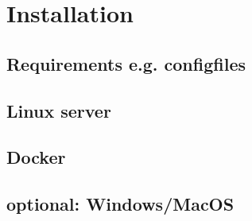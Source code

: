 
\section{Installation}

\subsection{Requirements e.g. configfiles}

\subsection{Linux server}

\subsection{Docker}

\subsection{optional: Windows/MacOS}